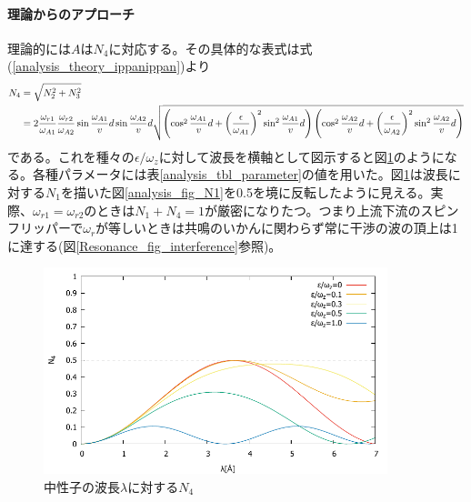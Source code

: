 \paragraph{理論からのアプローチ}
理論的には$A$は$N_4$に対応する。その具体的な表式は式(\ref{analysis_theory_ippanippan})より
\begin{align}
N_4&=\sqrt{N_2^2+N_3^2} \notag \\
&=2\frac{\omega_{r1}}{\omega_{A1}}\frac{\omega_{r2}}{\omega_{A2}}\sin\frac{\omega_{A1}}{v}d\sin\frac{\omega_{A2}}{v}d\sqrt{\left(\cos^2 \frac{\omega_{A1}}{v}d +\left(\frac{\epsilon}{\omega_{A1}}\right)^2\sin^2 \frac{\omega_{A1}}{v}d\right)\left(\cos^2 \frac{\omega_{A2}}{v}d+\left(\frac{\epsilon}{\omega_{A2}}\right)^2 \sin^2 \frac{\omega_{A2}}{v}d\right)}
\end{align}
である。これを種々の$\epsilon/\omega_z$に対して波長を横軸として図示すると図\ref{analysis_fig_N4}のようになる。各種パラメータには表\ref{analysis_tbl_parameter}の値を用いた。図\ref{analysis_fig_N4}は波長に対する$N_1$を描いた図\ref{analysis_fig_N1}を0.5を境に反転したように見える。実際、$\omega_{r1}=\omega_{r2}$のときは$N_1+N_4=1$が厳密になりたつ。つまり上流下流のスピンフリッパーで$\omega_r$が等しいときは共鳴のいかんに関わらず常に干渉の波の頂上は1に達する(図\ref{Resonance_fig_interference}参照)。
\begin{figure}[H]
\centering
\includegraphics[width=10cm]{analysis/A/N4.pdf}
\caption{中性子の波長$\lambda$に対する$N_4$}\label{analysis_fig_N4}
\end{figure}

